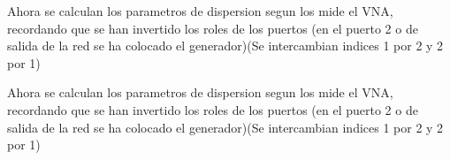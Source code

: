 \documentclass{article}
\begin{document}
\begin{Maple Normal}{
\begin{Maple Normal}{
}\end{Maple Normal}
}\end{Maple Normal}
\begin{maplegroup}
\mapleresult
{}
\end{maplegroup}
\begin{Maple Normal}{
\begin{Maple Normal}{
Ahora se calculan los parametros de dispersion segun los mide el VNA, recordando que se han invertido los roles de los puertos (en el puerto 2 o de salida de la red se ha colocado el generador)(Se intercambian indices 1 por 2 y 2 por 1)}\end{Maple Normal}

\begin{Maple Normal}{
Ahora se calculan los parametros de dispersion segun los mide el VNA, recordando que se han invertido los roles de los puertos (en el puerto 2 o de salida de la red se ha colocado el generador)(Se intercambian indices 1 por 2 y 2 por 1)}\end{Maple Normal}

}\end{Maple Normal}
\end{document}
